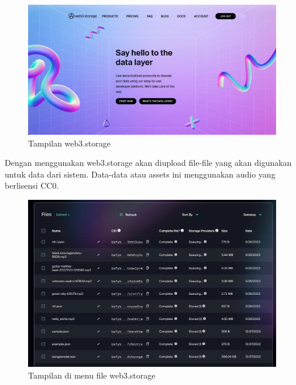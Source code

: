\begin{figure}[H]
  \centering

  \includegraphics[scale=0.3]{gambar/web3storage.jpg}

  \caption{Tampilan web3.storage}
  \label{fig:web3storage}
\end{figure}

Dengan menggunakan web3.storage akan diupload file-file yang akan digunakan untuk data dari sistem.
Data-data atau assets ini menggunakan audio yang berlisensi CC0.

\begin{figure}[H]
  \centering

  \includegraphics[scale=0.3]{gambar/web3storageacc.jpg}

  \caption{Tampilan di menu file web3.storage}
  \label{fig:web3storageacc}
\end{figure}

